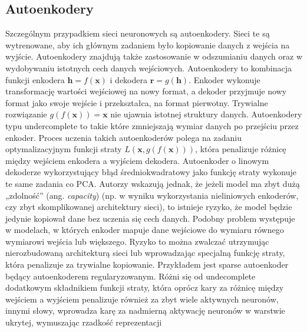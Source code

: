 \subsection{Autoenkodery}
Szczególnym przypadkiem sieci neuronowych są autoenkodery. Sieci te są wytrenowane, aby ich głównym zadaniem było kopiowanie danych z wejścia na wyjście. Autoenkodery znajdują także zastosowanie w odszumianiu danych oraz w wydobywaniu istotnych cech danych wejściowych. Autoenkodery to kombinacja funkcji enkodera $\mathbf{h} = f(\mathbf{x})$ i dekodera $\mathbf{r} = g(\mathbf{h})$. Enkoder wykonuje transformację wartości wejściowej na nowy format, a dekoder przyjmuje nowy format jako swoje wejście i przekształca, na format pierwotny.
Trywialne rozwiązanie $g(f(\mathbf{x}))=\mathbf{x}$ nie ujawnia istotnej struktury danych. 
Autoenkodery typu undercomplete to takie które zmniejszają wymiar danych po przejściu przez enkoder. Proces uczenia takich autoenkoderów polega na zadaniu optymalizacyjnym funkcji straty $L(\mathbf{x},g(f(\mathbf{x})))$, która penalizuje różnicę między wejściem enkodera a wyjściem dekodera. Autoenkoder o linowym dekoderze wykorzystujący błąd średniokwadratowy jako funkcję straty wykonuje te same zadania co PCA.
Autorzy wskazują jednak, że jeżeli model ma zbyt dużą „zdolność” (ang. \textit{capacity}) (np. w wyniku wykorzystania nieliniowych enkoderów, czy zbyt skomplikowanej architektury sieci), to istnieje ryzyko, że model będzie jedynie kopiował dane bez uczenia się cech danych. Podobny problem występuje w modelach, w których enkoder mapuje dane wejściowe do wymiaru równego wymiarowi wejścia lub większego. Ryzyko to można zwalczać utrzymując nierozbudowaną architekturą sieci lub wprowadzając specjalną funkcję straty, która penalizuje za trywialne kopiowanie. 
Przykładem jest sparse autoenkoder będący autoenkoderem regularyzowanym. 
Różni się od undecomplete dodatkowym składnikiem funkcji straty, która oprócz kary za różnicę między wejściem a wyjściem penalizuje również za zbyt wiele aktywnych neuronów, innymi słowy, wprowadza karę za nadmierną aktywację neuronów w warstwie ukrytej, wymuszając rzadkość reprezentacji

